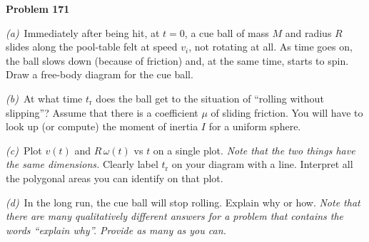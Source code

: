 \documentclass[12pt]{article}
\begin{document}
\begin{pottproblem}
\textbf{Problem 171}

\textsl{(a)}~Immediately after being hit, at $t=0$, a cue ball of mass
$M$ and radius $R$ slides along the pool-table felt at speed $v_i$, not rotating
at all.  As time goes on, the ball slows down (because of friction)
and, at the same time, starts to spin.  Draw a free-body diagram for
the cue ball.

\textsl{(b)}~At what time $t_\mathrm{r}$ does the ball get to the
situation of ``rolling without slipping''?  Assume that there is a
coefficient $\mu$ of sliding friction. You will have to look up (or
compute) the moment of inertia $I$ for a uniform sphere.

\textsl{(c)}~Plot $v(t)$ and $R\,\omega(t)$ vs $t$ on a single plot.
\emph{Note that the two things have the same
dimensions.}  Clearly label $t_\mathrm{r}$ on your diagram with a
line.
Interpret all the polygonal areas you can identify on that plot.

\textsl{(d)}~In the long run, the cue ball will stop rolling. Explain
why or how. \emph{Note that there are many qualitatively different
answers for a problem that contains the words ``explain why''.
Provide as many as you can.}
\end{pottproblem}
\end{document}

